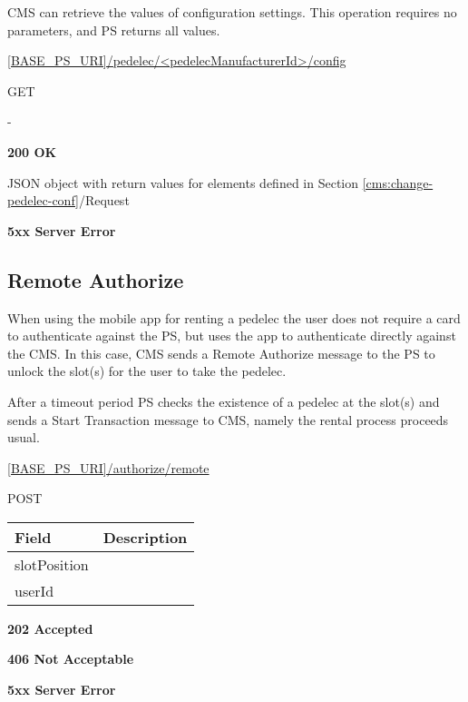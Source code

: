 \acs{CMS} can retrieve the values of configuration settings. This operation requires no parameters, and \acs{PS} returns all values.

 \url{[BASE_PS_URI]/pedelec/<pedelecManufacturerId>/config}

 GET

 -

 \textbf{200 OK}

JSON object with return values for elements defined in Section \ref{cms:change-pedelec-conf}/Request

 \textbf{5xx Server Error}

\subsection{Remote Authorize}

When using the mobile app for renting a pedelec the user does not require a card to authenticate against the \acs{PS}, but uses the app to authenticate directly against the \acs{CMS}. In this case, \acs{CMS} sends a Remote Authorize message to the \acs{PS} to unlock the slot(s) for the user to take the pedelec. 

After a timeout period \acs{PS} checks the existence of a pedelec at the slot(s) and sends a Start Transaction message to \acs{CMS}, namely the rental process proceeds usual.


 \url{[BASE_PS_URI]/authorize/remote}

 POST

\begin{table}[!h]
\vspace{-7mm}
\begin{tabularx}{\linewidth}{ | l | X | }
  \hline
  \rowcolor{table-head}
  Field & Description \\
  \hline
  slotPosition 		&  \\
  userId		&  \\
  \hline
\end{tabularx}
\end{table}

 \textbf{202 Accepted}

 \textbf{406 Not Acceptable}

\textbf{5xx Server Error}

